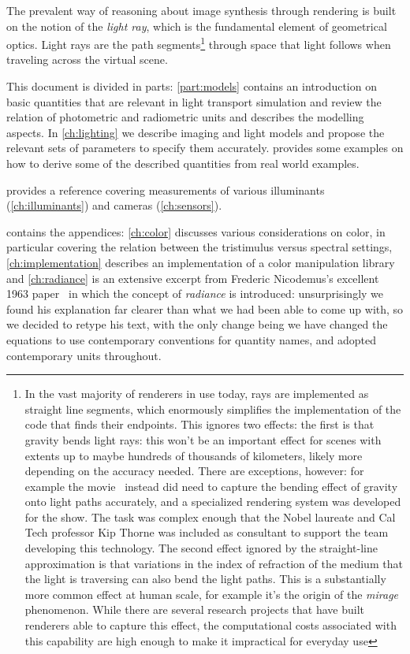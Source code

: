 The prevalent way of reasoning about image synthesis through rendering is 
built on the notion of the \textsl{light ray}, which is the fundamental element 
of geometrical optics. 
Light rays are the path segments\footnote{
	In the vast majority of renderers in use today, rays are implemented as 
	straight line segments, which enormously simplifies the implementation of the
	code that finds their endpoints. This ignores two effects: the first is that 
	gravity bends light rays: this won't be an important effect for scenes with 
	extents up to maybe hundreds of thousands of kilometers, likely more depending
	on the accuracy needed. 
	There are exceptions, however: for example the movie~\cite{interstellar2014} 
	instead did need to capture the bending effect of gravity onto light paths 
	accurately, and a specialized rendering system was developed for the show. 
	The task was complex enough that the Nobel laureate and Cal Tech professor 
	Kip Thorne was included as consultant to support the team developing this 
	technology. 
	The second effect ignored by the straight-line approximation is that 
	variations in the index of refraction of the medium that
	the light is traversing can also bend the light paths. 
	This is a substantially more common effect at human scale, for example 
	it's the origin of the \textsl{mirage} phenomenon. 
	While there are several research projects that have built renderers able 
	to capture this effect, the computational costs associated with this capability 
	are high enough to make it impractical for everyday use
} through space that light follows when traveling across the \gls{virtual scene}. 

This document is divided in parts: \cref{part:models}
contains an introduction on basic quantities that are relevant in
light transport simulation and review the relation of photometric and
radiometric units and describes the modelling aspects. In 
\cref{ch:lighting} we describe imaging and light models and propose the
relevant sets of parameters to specify them accurately.  
 provides some examples on how to derive some of
the described quantities from real world examples.

 provides a reference covering measurements of various 
illuminants (\cref{ch:illuminants}) and cameras (\cref{ch:sensors}).

 contains the appendices: \cref{ch:color} discusses
various considerations on color, in particular covering the relation between 
the tristimulus versus spectral settings,
\cref{ch:implementation} describes an implementation of a color manipulation library
and \cref{ch:radiance} is an extensive excerpt from Frederic Nicodemus's 
excellent 1963 paper~\cite{nicodemus63} in which the concept of \textsl{\gls{radiance}}
is introduced: unsurprisingly we found his explanation far clearer than what we 
had been able to come up with, so we decided to retype his text, with the only change being
we have changed the equations to use contemporary conventions for quantity names, and adopted
contemporary  units throughout.

